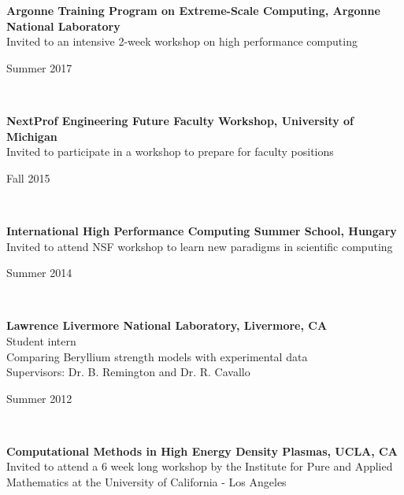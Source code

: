 \documentclass[11pt,letterpaper]{article}
\begin{document}
\begin{minipage}[t]{0.82\textwidth}%
  \textbf{Argonne Training Program on Extreme-Scale Computing, Argonne National Laboratory}\\%
  Invited to an intensive 2-week workshop on high performance computing%
\end{minipage}\hfill%
\begin{minipage}[t]{0.15\textwidth}\flushright%
  Summer 2017%
\end{minipage}\\[2ex]%
\begin{minipage}[t]{0.82\textwidth}%
  \textbf{NextProf Engineering Future Faculty Workshop, University of Michigan}\\%
  Invited to participate in a workshop to prepare for faculty positions%
\end{minipage}\hfill%
\begin{minipage}[t]{0.15\textwidth}\flushright%
  Fall 2015%
\end{minipage}\\[2ex]%
\begin{minipage}[t]{0.82\textwidth}%
  \textbf{International High Performance Computing Summer School, Hungary}\\%
  Invited to attend NSF workshop to learn new paradigms in scientific computing%
\end{minipage}\hfill%
\begin{minipage}[t]{0.15\textwidth}\flushright%
  Summer 2014%
\end{minipage}\\[2ex]%
\begin{minipage}[t]{0.82\textwidth}%
  \textbf{Lawrence Livermore National Laboratory, Livermore, CA}\\%
  Student intern\\%
  Comparing Beryllium strength models with experimental data\\%
  Supervisors: Dr. B. Remington and Dr. R. Cavallo%
\end{minipage}\hfill%
\begin{minipage}[t]{0.15\textwidth}\flushright%
  Summer 2012%
\end{minipage}\\[2ex]%
\begin{minipage}[t]{0.82\textwidth}%
  \textbf{Computational Methods in High Energy Density Plasmas, UCLA, CA}\\%
  Invited to attend a 6 week long workshop by the Institute for Pure and Applied Mathematics at the University of California - Los Angeles%
\end{minipage}\hfill%
\end{document}
